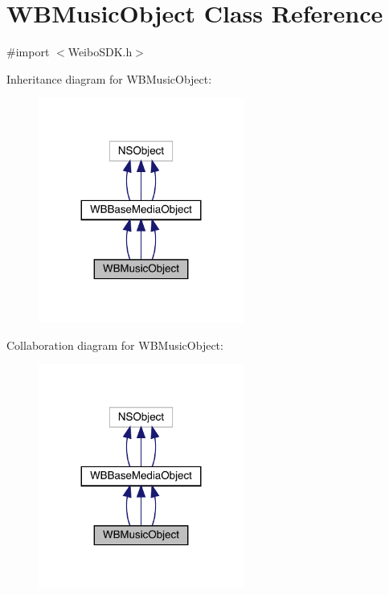 \hypertarget{interface_w_b_music_object}{}\section{W\+B\+Music\+Object Class Reference}
\label{interface_w_b_music_object}


{\ttfamily \#import $<$Weibo\+S\+D\+K.\+h$>$}



Inheritance diagram for W\+B\+Music\+Object\+:\nopagebreak
\begin{figure}[H]
\begin{center}
\leavevmode
\includegraphics[width=191pt]{interface_w_b_music_object__inherit__graph}
\end{center}
\end{figure}


Collaboration diagram for W\+B\+Music\+Object\+:\nopagebreak
\begin{figure}[H]
\begin{center}
\leavevmode
\includegraphics[width=191pt]{interface_w_b_music_object__coll__graph}
\end{center}
\end{figure}
